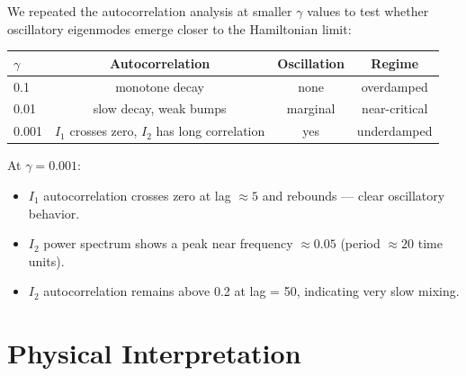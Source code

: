 \documentclass[11pt]{article}
\begin{document}
We repeated the autocorrelation analysis at smaller $\gamma$ values to test whether oscillatory eigenmodes emerge closer to the Hamiltonian limit:

\begin{center}
\begin{tabular}{lccc}
\toprule
$\gamma$ & Autocorrelation & Oscillation & Regime \\
\midrule
0.1 & monotone decay & none & overdamped \\
0.01 & slow decay, weak bumps & marginal & near-critical \\
0.001 & $I_1$ crosses zero, $I_2$ has long correlation & yes & underdamped \\
\bottomrule
\end{tabular}
\end{center}

At $\gamma = 0.001$:
\begin{itemize}
\item $I_1$ autocorrelation crosses zero at lag $\approx 5$ and rebounds --- clear oscillatory behavior.
\item $I_2$ power spectrum shows a peak near frequency $\approx 0.05$ (period $\approx 20$ time units).
\item $I_2$ autocorrelation remains above 0.2 at lag = 50, indicating very slow mixing.
\end{itemize}

\section{Physical Interpretation}
\end{document}
